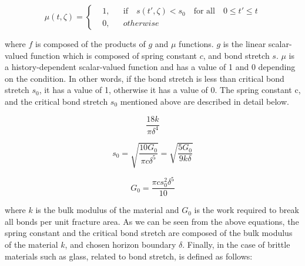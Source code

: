 \begin{equation}
  \mu(t,\zeta) = \left \{
  \begin{aligned}
    &1, && \textrm{if} \quad s(t',\zeta)<s_0 \quad \textrm{for all} \quad 0 \leq t' \leq t\\
    &0, && otherwise
  \end{aligned} \right.
\end{equation}


\noindent where $f$ is composed of the products of $g$ and $\mu$ functions. $g$ is the linear scalar-valued function which is composed of spring constant $c$, and bond stretch $s$. $\mu$ is a history-dependent scalar-valued function and has a value of 1 and 0 depending on the condition. In other words, if the bond stretch is less than critical bond stretch $s_0$, it has a value of 1, otherwise it has a value of 0. The spring constant c, and the critical bond stretch $s_0$ mentioned above are described in detail below.

 \begin{equation}
\frac{18k}{\pi\delta^4}
\end{equation}

 \begin{equation}
s_0=\sqrt{\frac{10G_0}{\pi c\delta^5}}=\sqrt{\frac{5G_0}{9 k\delta}}
\end{equation}

 \begin{equation}
G_0=\frac{\pi cs_0^2\delta^5}{10} 
\end{equation}

\noindent where $k$ is the bulk modulus of the material and $G_0$ is the work required to break all bonds per unit fracture area. As we can be seen from the above equations, the spring constant and the critical bond stretch are composed of the bulk modulus of the material $k$, and chosen horizon boundary $\delta$. Finally, in the case of brittle materials such as glass, related to bond stretch, is defined as follows:

